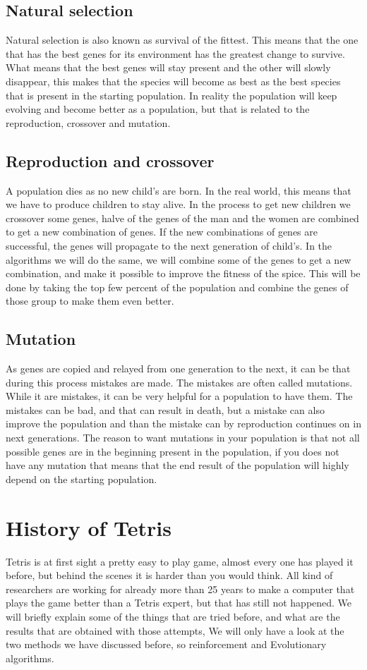 \documentclass{report}
\begin{document}
\subsection{Natural selection}
Natural selection is also known as survival of the fittest. This means that the one that has the best genes for its environment has the greatest change to survive. What means that the best genes will stay present and the other will slowly disappear, this makes that the species will become as best as the best species that is present in the starting population. In reality the population will keep evolving and become better as a population, but that is related to the reproduction, crossover and mutation.

\subsection{Reproduction and crossover}
A population dies as no new child's are born. In the real world, this means that we have to produce children to stay alive. In the process to get new children we crossover some genes, halve of the genes of the man and the women are combined to get a new combination of genes. If the new combinations of genes are successful, the genes will propagate to the next generation of child's. In the algorithms we will do the same, we will combine some of the genes to get a new combination, and make it possible to improve the fitness of the spice. This will be done by taking the top few percent of the population and combine the genes of those group to make them even better.

\subsection{Mutation}
As genes are copied and relayed from one generation to the next, it can be that during this process mistakes are made. The mistakes are often called mutations. While it are mistakes, it can be very helpful for a population to have them. The mistakes can be bad, and that can result in death, but a mistake can also improve the population and than the mistake can by reproduction continues on in next generations. The reason to want mutations in your population is that not all possible genes are in the beginning present in the population, if you does not have any mutation that means that the end result of the population will highly depend on the starting population.

\section{History of Tetris}
Tetris is at first sight a pretty easy to play game, almost every one has played it before, but behind the scenes it is harder than you would think. All kind of researchers are working for already more than 25 years to make a computer that plays the game better than a Tetris expert, but that has still not happened. We will briefly explain some of the things that are tried before, and what are the results that are obtained with those attempts\cite{Tetris_ML}, We will only have a look at the two methods we have discussed before, so reinforcement and Evolutionary algorithms.
\end{document}
